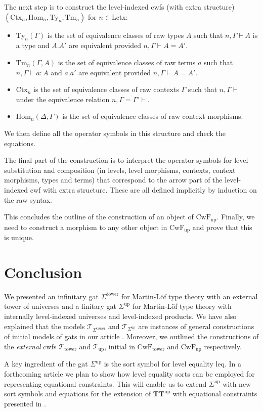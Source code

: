 \documentclass[submission,copyright,creativecommons]{eptcs}
\newcommand{\Ctx}{\mathrm{Ctx}}
\newcommand{\Sub}{\mathrm{Hom}}
\newcommand{\Ty}{\mathrm{Ty}}
\newcommand{\Tm}{\mathrm{Tm}}
\newcommand{\Lctx}{\mathrm{Lctx}}
\newcommand{\T}{\mathsf{T}}
\def\leq{\mathrm{leq}}
\def\T{\mathcal{T}}
\def\CwFext{\mathrm{CwF_{tower}}}
\def\CwFint{\mathrm{CwF_{up}}}
\def\Sigmaext{{\Sigma^\mathrm{tower}}}
\def\Sigmaint{{\Sigma^\mathrm{up}}}
\def\TTint{{\mathbf{TT}^\mathrm{up}}}
\def\Text{\T_\mathrm{tower}}
\def\Tint{\T_\mathrm{up}}
\begin{document}
The next step is to construct the level-indexed cwfs (with extra structure) $(\Ctx_n,\Sub_n,\Ty_n,\Tm_n)$ for $n \in \Lctx$:
\begin{itemize}
\item $\Ty_n(\Gamma)$ is the set of equivalence classes of raw types $A$ such that $n, \Gamma \vdash A$ is a type and $A.A'$ are equivalent provided $n, \Gamma \vdash A = A'$.
\item $\Tm_n(\Gamma,A)$ is the set of equivalence classes of raw terms $a$ such that $n, \Gamma \vdash a : A$ and $a.a'$ are equivalent provided $n, \Gamma \vdash A = A'$.
\item $\Ctx_n$ is the set of equivalence classes of raw contexts $\Gamma$ such that $n, \Gamma \vdash$ under the equivalence relation $n, \Gamma = \Gamma' \vdash$.
\item $\Sub_n(\Delta,\Gamma)$ is the set of equivalence classes of raw context morphisms.
\end{itemize}
We then define all the operator symbols in this structure and check the equations.

The final part of the construction is to interpret the operator symbols for level substitution and composition (in levels, level morphisms, contexts, context morphisms, types and terms) that correspond to the arrow part of the level-indexed cwf with extra structure. These are all defined implicitly by induction on the raw syntax.

This concludes the outline of the construction of an object of $\CwFint$. Finally, we need to construct a morphism to any other object in $\CwFint$ and prove that this is unique.


\section{Conclusion}

We presented an infinitary gat $\Sigmaext$ for Martin-Löf type theory with an external tower of universes and a finitary gat $\Sigmaint$ for Martin-Löf type theory with internally level-indexed universes and level-indexed products. We have also explained that the models $\T_{\Sigmaext}$ and $\T_{\Sigmaint}$ are instances of general constructions of initial models of gats in our article
\cite{bezem:hofmann}. Moreover, we outlined the constructions of the {\em external} cwfs $\Text$ and $\Tint$, initial in $\CwFext$ and $\CwFint$ respectively.

A key ingredient of the gat $\Sigmaint$ is the sort symbol for level equality $\leq$. In a forthcoming article we plan to show how level equality sorts can be employed for representing equational constraints. This will enable us to extend $\Sigmaint$ with new sort symbols and equations for the extension of $\TTint$ with equational constraints presented in \cite[Section 5]{BezemCDE22}.
\end{document}
